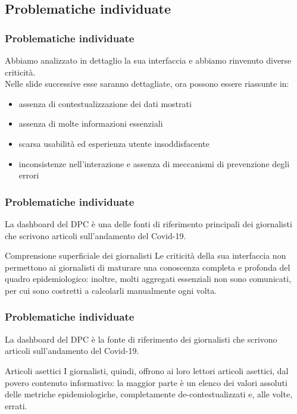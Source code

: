 \documentclass[../../main.tex]{subfiles}
\begin{document}
\subsection{Problematiche individuate}

\begin{frame}
    \frametitle{Problematiche individuate}
    Abbiamo analizzato in dettaglio la sua interfaccia e abbiamo rinvenuto diverse criticità.\\
    Nelle slide successive esse saranno dettagliate, ora possono essere riassunte in:
    \begin{itemize}
        \item<1-> assenza di contestualizzazione dei dati mostrati
        \item<2-> assenza di molte informazioni essenziali
        \item<3-> scarsa usabilità ed esperienza utente insoddisfacente
        \item<4-> inconsistenze nell'interazione e assenza di meccanismi di prevenzione degli errori
    \end{itemize}

\end{frame}

\begin{frame}
    \frametitle{Problematiche individuate}
    La dashboard del DPC è una delle fonti di riferimento principali dei giornalisti che scrivono articoli sull'andamento del Covid-19.
    \vspace{-50pt}
    \begin{alertblock}{Comprensione superficiale dei giornalisti}
        Le criticità della sua interfaccia non permettono ai giornalisti di maturare una conoscenza completa e profonda del quadro epidemiologico: inoltre, molti aggregati essenziali non sono comunicati, per cui sono costretti a calcolarli manualmente ogni volta.
    \end{alertblock}

\end{frame}

\begin{frame}
    \frametitle{Problematiche individuate}
    La dashboard del DPC è la fonte di riferimento dei giornalisti che scrivono articoli sull'andamento del Covid-19.
    \vspace{-50pt}
    \begin{alertblock}{Articoli asettici}
        I giornalisti, quindi, offrono ai loro lettori articoli asettici, dal povero contenuto informativo: la maggior parte è un elenco dei valori assoluti delle metriche epidemiologiche, completamente de-contestualizzati e, alle volte, errati.
    \end{alertblock}

\end{frame}
\end{document}
